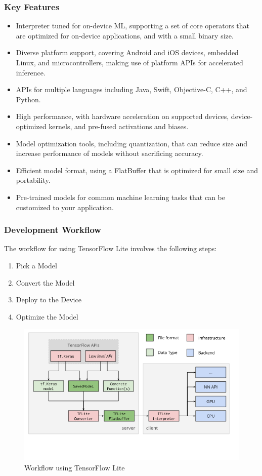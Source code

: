 \documentclass[14pt]{report}
\begin{document}
				\subsubsection{Key Features}
					\begin{itemize}
						\item Interpreter tuned for on-device ML, supporting a set of core operators that are optimized for on-device applications, and with a small binary size.
						\item Diverse platform support, covering Android and iOS devices, embedded Linux, and microcontrollers, making use of platform APIs for accelerated inference.
						\item APIs for multiple languages including Java, Swift, Objective-C, C++, and Python.
						\item High performance, with hardware acceleration on supported devices, device-optimized kernels, and pre-fused activations and biases.
						\item Model optimization tools, including quantization, that can reduce size and increase performance of models without sacrificing accuracy.
						\item Efficient model format, using a FlatBuffer that is optimized for small size and portability.
						\item Pre-trained models for common machine learning tasks that can be customized to your application.
					\end{itemize}
				\subsubsection{Development Workflow}

					
					The workflow for using TensorFlow Lite involves the following steps:
					\begin{enumerate}
						\item Pick a Model
						\item Convert the Model
						\item Deploy to the Device
						\item Optimize the Model
					\end{enumerate}
					\begin{figure}[h]
						\includegraphics[width=\textwidth]{TensorWorkflow.png}
						\centering
						\caption{Workflow using TensorFlow Lite}
					\end{figure}
\end{document}
